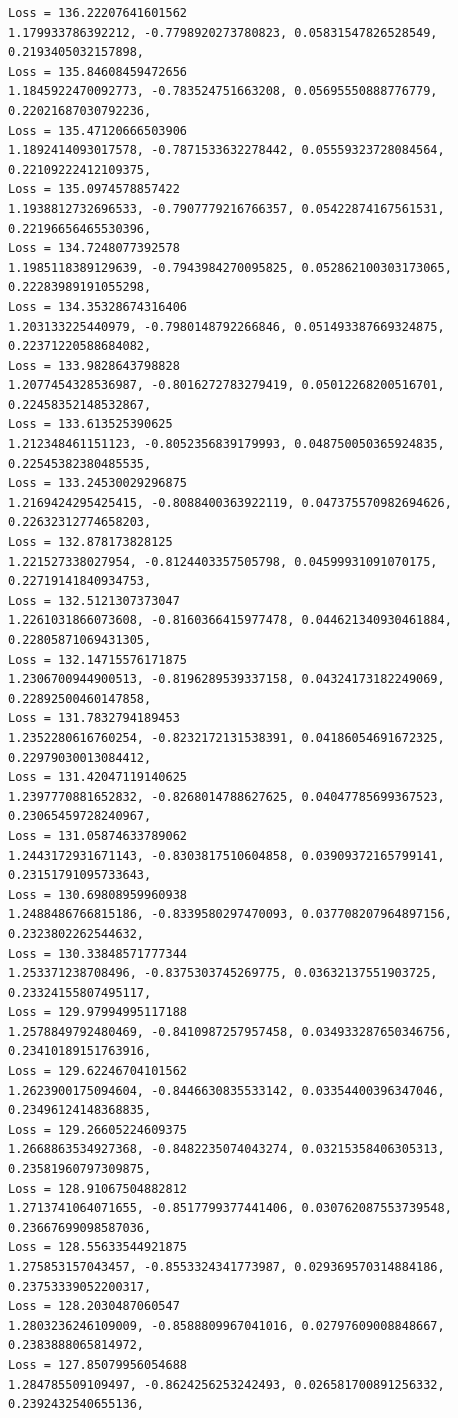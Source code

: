 \documentclass[11pt]{article}
\begin{document}
\begin{Verbatim}[commandchars=\\\{\}]
Loss = 136.22207641601562
1.179933786392212, -0.7798920273780823, 0.05831547826528549, 0.2193405032157898,
Loss = 135.84608459472656
1.1845922470092773, -0.783524751663208, 0.05695550888776779,
0.22021687030792236,
Loss = 135.47120666503906
1.1892414093017578, -0.7871533632278442, 0.05559323728084564,
0.22109222412109375,
Loss = 135.0974578857422
1.1938812732696533, -0.7907779216766357, 0.05422874167561531,
0.22196656465530396,
Loss = 134.7248077392578
1.1985118389129639, -0.7943984270095825, 0.052862100303173065,
0.22283989191055298,
Loss = 134.35328674316406
1.203133225440979, -0.7980148792266846, 0.051493387669324875,
0.22371220588684082,
Loss = 133.9828643798828
1.2077454328536987, -0.8016272783279419, 0.05012268200516701,
0.22458352148532867,
Loss = 133.613525390625
1.212348461151123, -0.8052356839179993, 0.048750050365924835,
0.22545382380485535,
Loss = 133.24530029296875
1.2169424295425415, -0.8088400363922119, 0.047375570982694626,
0.22632312774658203,
Loss = 132.878173828125
1.221527338027954, -0.8124403357505798, 0.04599931091070175,
0.22719141840934753,
Loss = 132.5121307373047
1.2261031866073608, -0.8160366415977478, 0.044621340930461884,
0.22805871069431305,
Loss = 132.14715576171875
1.2306700944900513, -0.8196289539337158, 0.04324173182249069,
0.22892500460147858,
Loss = 131.7832794189453
1.2352280616760254, -0.8232172131538391, 0.04186054691672325,
0.22979030013084412,
Loss = 131.42047119140625
1.2397770881652832, -0.8268014788627625, 0.04047785699367523,
0.23065459728240967,
Loss = 131.05874633789062
1.2443172931671143, -0.8303817510604858, 0.03909372165799141,
0.23151791095733643,
Loss = 130.69808959960938
1.2488486766815186, -0.8339580297470093, 0.037708207964897156,
0.2323802262544632,
Loss = 130.33848571777344
1.253371238708496, -0.8375303745269775, 0.03632137551903725,
0.23324155807495117,
Loss = 129.97994995117188
1.2578849792480469, -0.8410987257957458, 0.034933287650346756,
0.23410189151763916,
Loss = 129.62246704101562
1.2623900175094604, -0.8446630835533142, 0.03354400396347046,
0.23496124148368835,
Loss = 129.26605224609375
1.2668863534927368, -0.8482235074043274, 0.03215358406305313,
0.23581960797309875,
Loss = 128.91067504882812
1.2713741064071655, -0.8517799377441406, 0.030762087553739548,
0.23667699098587036,
Loss = 128.55633544921875
1.275853157043457, -0.8553324341773987, 0.029369570314884186,
0.23753339052200317,
Loss = 128.2030487060547
1.2803236246109009, -0.8588809967041016, 0.02797609008848667,
0.2383888065814972,
Loss = 127.85079956054688
1.284785509109497, -0.8624256253242493, 0.026581700891256332,
0.2392432540655136,

\end{Verbatim}
\end{document}
